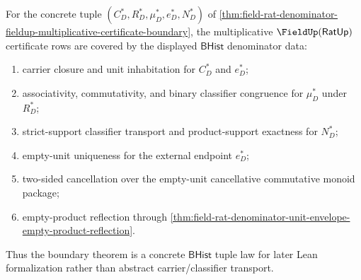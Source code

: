 \begin{theorem}
\label{thm:field-rat-denominator-fieldup-multiplicative-obligation-coverage}
For the concrete tuple
$(C_D^\ast,R_D^\ast,\mu_D^\ast,e_D^\ast,N_D^\ast)$ of
\autoref{thm:field-rat-denominator-fieldup-multiplicative-certificate-boundary},
the multiplicative $\FieldUp(\mathsf{RatUp})$ certificate rows are covered by
the displayed $\mathsf{BHist}$ denominator data:
\begin{enumerate}
  \item carrier closure and unit inhabitation for $C_D^\ast$ and
  $e_D^\ast$;
  \item associativity, commutativity, and binary classifier congruence for
  $\mu_D^\ast$ under $R_D^\ast$;
  \item strict-support classifier transport and product-support exactness for
  $N_D^\ast$;
  \item empty-unit uniqueness for the external endpoint $e_D^\ast$;
  \item two-sided cancellation over the empty-unit cancellative commutative
  monoid package;
  \item empty-product reflection through
  \autoref{thm:field-rat-denominator-unit-envelope-empty-product-reflection}.
\end{enumerate}
Thus the boundary theorem is a concrete $\mathsf{BHist}$ tuple law for later
Lean formalization rather than abstract carrier/classifier transport.
\end{theorem}
